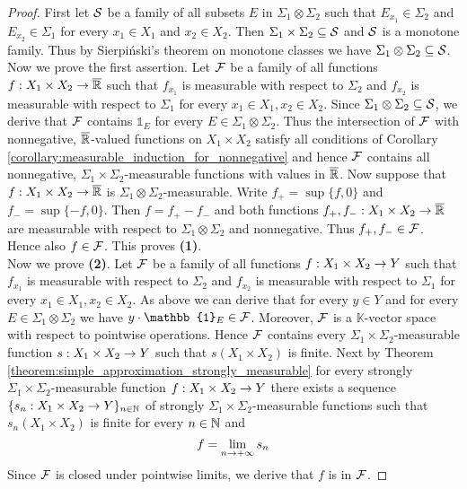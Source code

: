\begin{proof}
First let ${\mathcal S}$ be a family of all subsets $E$ in $\Sigma_1\otimes \Sigma_2$ such that $E_{x_1}\in \Sigma_2$ and $E_{x_2}\in \Sigma_1$ for every $x_1\in X_1$ and $x_2\in X_2$. Then $\Sigma_1\times \Sigma_2\subseteq {\mathcal S}$ and ${\mathcal S}$ is a monotone family. Thus by Sierpiński's theorem on monotone classes we have $\Sigma_1\otimes \Sigma_2\subseteq {\mathcal S}$.\\
Now we prove the first assertion. Let ${\mathcal F}$ be a family of all functions $f:X_1\times X_2\rightarrow \overline{{\mathbb R}}$ such that $f_{x_1}$ is measurable with respect to $\Sigma_2$ and $f_{x_2}$ is measurable with respect to $\Sigma_1$ for every $x_1\in X_1,x_2\in X_2$. Since $\Sigma_1\otimes \Sigma_2\subseteq {\mathcal S}$, we derive that ${\mathcal F}$ contains $\mathbb{1}_E$ for every $E\in \Sigma_1\otimes \Sigma_2$. Thus the intersection of ${\mathcal F}$ with nonnegative, $\overline{{\mathbb R}}$-valued functions on $X_1\times X_2$ satisfy all conditions of Corollary \ref{corollary:measurable_induction_for_nonnegative} and hence ${\mathcal F}$ contains all nonnegative, $\Sigma_1\times \Sigma_2$-measurable functions with values in $\overline{{\mathbb R}}$. Now suppose that $f:X_1\times X_2\rightarrow \overline{{\mathbb R}}$ is $\Sigma_1\otimes \Sigma_2$-measurable. Write $f_+ = \sup\{f, 0\}$ and $f_- = \sup\{-f, 0\}$. Then $f = f_+ - f_-$ and both functions $f_+,f_-:X_1\times X_2\rightarrow \overline{{\mathbb R}}$ are measurable with respect to $\Sigma_1\otimes \Sigma_2$ and nonnegative. Thus $f_+,f_-\in {\mathcal F}$. Hence also $f\in {\mathcal F}$. This proves \textbf{(1)}.\\
Now we prove \textbf{(2)}. Let ${\mathcal F}$ be a family of all functions $f:X_1\times X_2\rightarrow Y$ such that $f_{x_1}$ is measurable with respect to $\Sigma_2$ and $f_{x_2}$ is measurable with respect to $\Sigma_1$ for every $x_1\in X_1,x_2\in X_2$. As above we can derive that for every $y\in Y$ and for every $E\in \Sigma_1\otimes \Sigma_2$ we have $y\cdot \mathbb{1}_E\in \cF$. Moreover, ${\mathcal F}$ is a $\mathbb{K}$-vector space with respect to pointwise operations. Hence ${\mathcal F}$ contains every $\Sigma_1\times \Sigma_2$-measurable function $s:X_1\times X_2\rightarrow Y$ such that $s(X_1\times X_2)$ is finite. Next by Theorem \ref{theorem:simple_approximation_strongly_measurable} for every strongly $\Sigma_1\times \Sigma_2$-measurable function $f:X_1\times X_2\rightarrow Y$ there exists a sequence $\{s_n:X_1\times X_2\rightarrow Y\}_{n\in {\mathbb N}}$ of strongly $\Sigma_1\times \Sigma_2$-measurable functions such that $s_n(X_1\times X_2)$ is finite for every $n\in {\mathbb N}$ and
$$f = \lim_{n\rightarrow +\infty}s_n$$
Since ${\mathcal F}$ is closed under pointwise limits, we derive that $f$ is in ${\mathcal F}$.
\end{proof}

